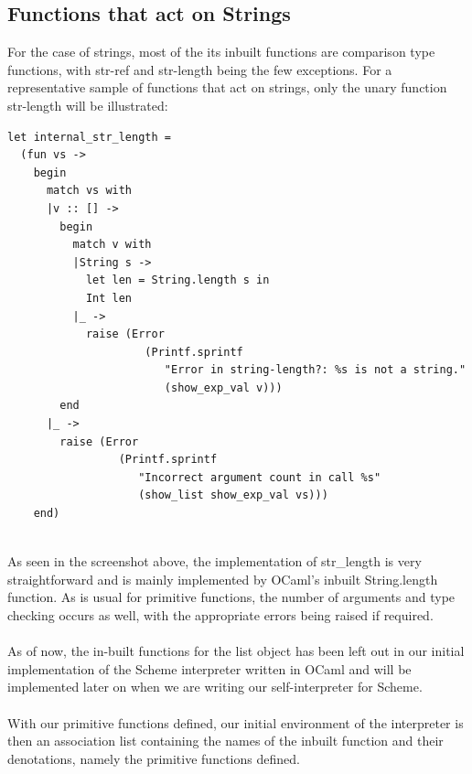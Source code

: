 \subsection{Functions that act on Strings}
For the case of strings, most of the its inbuilt functions are comparison type functions, with str-ref and str-length being the few exceptions.  For a representative sample of functions that act on strings, only the 
unary function str-length will be illustrated:
\begin{scriptsize}
\begin{verbatim}
let internal_str_length =   
  (fun vs ->
    begin
      match vs with
      |v :: [] ->
        begin
          match v with
          |String s ->
            let len = String.length s in
            Int len
          |_ ->
            raise (Error
                     (Printf.sprintf
                        "Error in string-length?: %s is not a string."
                        (show_exp_val v)))
        end
      |_ ->
        raise (Error
                 (Printf.sprintf
                    "Incorrect argument count in call %s"
                    (show_list show_exp_val vs)))
    end)
\end{verbatim}
\end{scriptsize}
\\
As seen in the screenshot above, the implementation of str\_length is very straightforward and is mainly implemented by OCaml’s inbuilt String.length function. As is usual for primitive functions, the number of 
arguments and type checking occurs as well, with the appropriate errors being raised if required.
\\
\\
As of now, the in-built functions for the list object has been left out in our initial implementation of the Scheme interpreter written in OCaml and will be implemented later on when we are writing our self-interpreter for Scheme.
\\
\\
With our primitive functions defined, our initial environment of the interpreter is then an association list containing the names of the inbuilt function and their denotations, namely the primitive functions defined.

